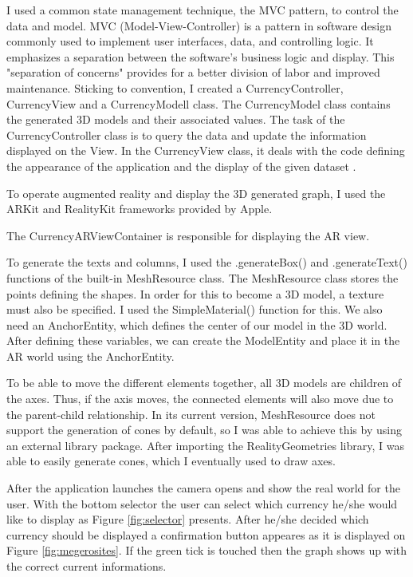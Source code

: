 \documentclass[a4paper,oneside]{article}
\begin{document}
I used a common state management technique, the MVC pattern, to control the data and model. MVC (Model-View-Controller) is a pattern in software design commonly used to implement user interfaces, data, and controlling logic. It emphasizes a separation between the software's business logic and display. This "separation of concerns" provides for a better division of labor and improved maintenance.  Sticking to convention, I created a CurrencyController, CurrencyView and a CurrencyModell class. The CurrencyModel class contains the generated 3D models and their associated values. The task of the CurrencyController class is to query the data and update the information displayed on the View. In the CurrencyView class, it deals with the code defining the appearance of the application and the display of the given dataset \cite{mozilla}.

To operate augmented reality and display the 3D generated graph, I used the ARKit and RealityKit frameworks provided by Apple.

The CurrencyARViewContainer is responsible for displaying the AR view.

To generate the texts and columns, I used the .generateBox() and .generateText() functions of the built-in MeshResource class.
The MeshResource class stores the points defining the shapes. In order for this to become a 3D model, a texture must also be specified. I used the SimpleMaterial() function for this.
We also need an AnchorEntity, which defines the center of our model in the 3D world.
After defining these variables, we can create the ModelEntity and place it in the AR world using the AnchorEntity.


To be able to move the different elements together, all 3D models are children of the axes. Thus, if the axis moves, the connected elements will also move due to the parent-child relationship. In its current version, MeshResource does not support the generation of cones by default, so I was able to achieve this by using an external library package. After importing the RealityGeometries library, I was able to easily generate cones, which I eventually used to draw axes.

After the application launches the camera opens and show the real world for the user.  With the bottom selector the user can select which currency he/she  would like to display as Figure \ref{fig:selector} presents.
After he/she decided which currency should be displayed a confirmation button appeares as it is displayed on Figure \ref{fig:megerosites}. If the green tick is touched then the graph shows up with the correct current informations.
\end{document}

